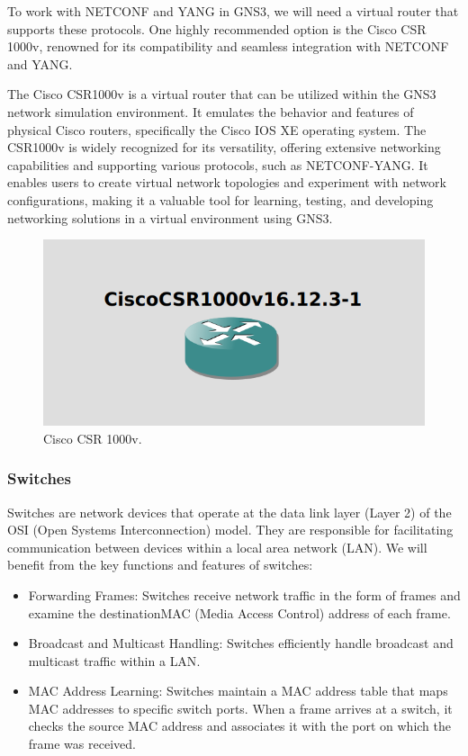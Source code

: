 To work with NETCONF and YANG in GNS3, we will need a virtual router that supports these protocols. One highly recommended option is the Cisco CSR 1000v, renowned for its compatibility and seamless integration with NETCONF and YANG.

The Cisco CSR1000v is a virtual router that can be utilized within the GNS3 network simulation environment. It emulates the behavior and features of physical Cisco routers, specifically the Cisco IOS XE operating system. The CSR1000v is widely recognized for its versatility, offering extensive networking capabilities and supporting various protocols, such as NETCONF-YANG. It enables users to create virtual network topologies and experiment with network configurations, making it a valuable tool for learning, testing, and developing networking solutions in a virtual environment using GNS3.

\begin{figure}[h]
    \centering
    \includegraphics[width=0.4\linewidth]{Images/cisco1000v.png}
    \caption{Cisco CSR 1000v.}
    \label{fig:example}
\end{figure}

\subsubsection{Switches}
Switches are network devices that operate at the data link layer (Layer 2) of the OSI (Open Systems Interconnection) model. They are responsible for facilitating communication between devices within a local area network (LAN). We will benefit from the key functions and features of switches:

\begin{itemize}
    \item Forwarding Frames: Switches receive network traffic in the form of frames and examine the destination\gls{MAC} (Media Access Control) address of each frame. 
    
    \item Broadcast and Multicast Handling: Switches efficiently handle broadcast and multicast traffic within a \gls{LAN}.
    
    \item MAC Address Learning: Switches maintain a MAC address table that maps MAC addresses to specific switch ports. When a frame arrives at a switch, it checks the source MAC address and associates it with the port on which the frame was received.
\end{itemize}

